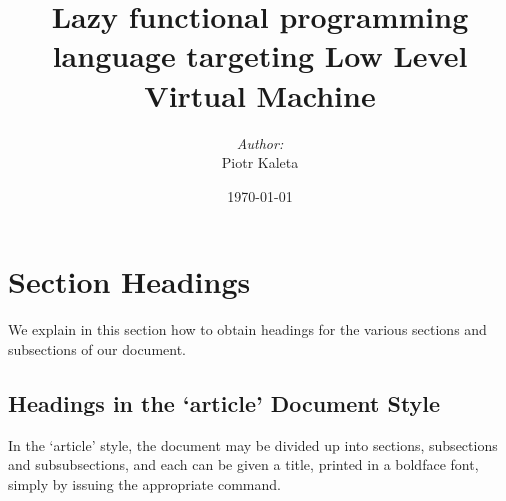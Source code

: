 \documentclass{report}
\begin{document}
\title{Lazy functional programming language targeting Low Level Virtual Machine}
\author{\emph{Author:}\\Piotr Kaleta}
\date{\today}

\maketitle

\cleardoublepage

\begin{abstract}
\end{abstract}

\tableofcontents

\section{Section Headings}

We explain in this section how to obtain headings
for the various sections and subsections of our
document.

\subsection{Headings in the `article' Document Style}

In the `article' style, the document may be divided up
into sections, subsections and subsubsections, and each
can be given a title, printed in a boldface font, simply by issuing the
appropriate command.
\end{document}
